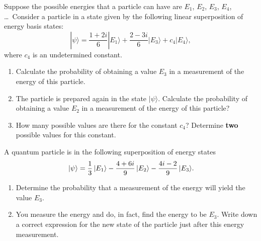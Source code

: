 
\begin{problem}
Suppose the possible energies that a particle can have are $E_1$,
$E_2$,  $E_3$, $E_4$, \dots\  Consider a particle in a state given by
the following linear superposition of energy basis states:
\begin{equation}
|\psi\rangle = \frac{1+2 i}{6} |E_1\rangle 
                + \frac{2-3  i}{6} |E_3\rangle 
                + c_4 |E_4\rangle,
\end{equation}
where $c_4$ is an undetermined constant.
\begin{enumerate}
\item Calculate the probability of obtaining a value $E_3$ in 
a measurement of the energy of this particle.
\item The particle is prepared again in the state $|\psi\rangle$.
Calculate the probability of obtaining a value $E_2$ in a 
measurement of the energy of this particle?  

\item How many possible values are there for the constant $c_4$?  
Determine \textbf{two} possible values for this constant.
\end{enumerate}
\label{prob:energystates}
\end{problem}


\begin{problem}
  A quantum particle is in the following superposition of energy states
  \[
  \,|\mbox{$\psi$}\rangle = \frac{1}{3}\,|\mbox{$E_1$}\rangle - \frac{4+6 i}{9}\,|\mbox{$E_2$}\rangle
  -\frac{4i - 2}{9}\,|\mbox{$E_3$}\rangle .
  \]

  \begin{enumerate}
  \item Determine the probability that a measurement of the energy
    will yield the value $E_3$.

  \item You measure the energy and do, in fact, find the energy to be
    $E_3$.  Write
    down a correct expression for the new state of the particle just
    after this energy measurement.


  \end{enumerate}
\end{problem}


